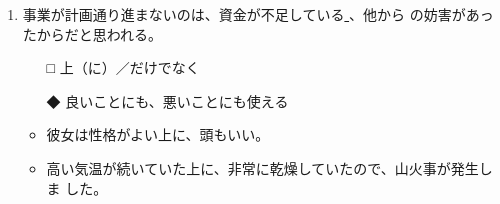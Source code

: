 \documentclass[
uplatex,
b5paper,
10pt,
dvipdfmx
]{jsbook}
\begin{document}
\begin{enumerate}
\item 事業が計画通り進まないのは、資金が不足している\underline{    }、他から
      の妨害があったからだと思われる。

\begin{itemize}
\item[□] 上（に）／だけでなく
\item[◆] 良いことにも、悪いことにも使える
\end{itemize}
\begin{itemize}
\item 彼女は性格がよい上に、頭もいい。
\item 高い気温が続いていた上に、非常に乾燥していたので、山火事が発生しま
      した。
\end{itemize}
\end{enumerate}
\end{document}
